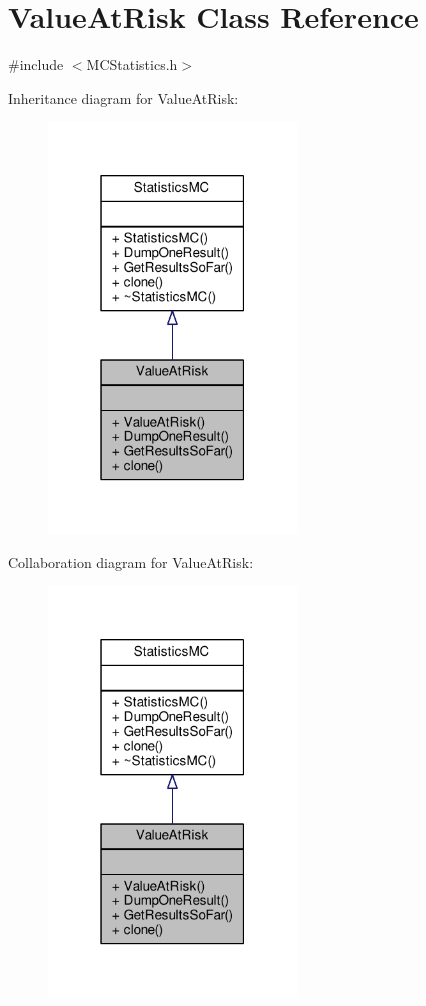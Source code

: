 \hypertarget{classValueAtRisk}{}\section{Value\+At\+Risk Class Reference}
\label{classValueAtRisk}


{\ttfamily \#include $<$M\+C\+Statistics.\+h$>$}



Inheritance diagram for Value\+At\+Risk\+:
\nopagebreak
\begin{figure}[H]
\begin{center}
\leavevmode
\includegraphics[width=187pt]{classValueAtRisk__inherit__graph}
\end{center}
\end{figure}


Collaboration diagram for Value\+At\+Risk\+:
\nopagebreak
\begin{figure}[H]
\begin{center}
\leavevmode
\includegraphics[width=187pt]{classValueAtRisk__coll__graph}
\end{center}
\end{figure}

